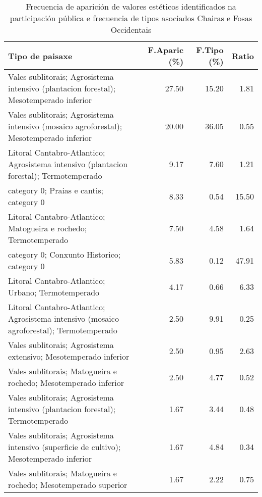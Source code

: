 \begin{table}[p]
\centering
\caption{Frecuencia de aparición de valores estéticos identificados na participación pública e frecuencia de tipos asociados Chairas e Fosas Occidentais} 
\label{vsixotest11}
\begin{tabular}{lrrr}
  \hline
Tipo de paisaxe & F.Aparic (\%) & F.Tipo (\%) & Ratio \\ 
  \hline
Vales sublitorais; Agrosistema intensivo (plantacion forestal); Mesotemperado inferior & 27.50 & 15.20 & 1.81 \\ 
  Vales sublitorais; Agrosistema intensivo (mosaico agroforestal); Mesotemperado inferior & 20.00 & 36.05 & 0.55 \\ 
  Litoral Cantabro-Atlantico; Agrosistema intensivo (plantacion forestal); Termotemperado & 9.17 & 7.60 & 1.21 \\ 
  category 0; Praias e cantis; category 0 & 8.33 & 0.54 & 15.50 \\ 
  Litoral Cantabro-Atlantico; Matogueira e rochedo; Termotemperado & 7.50 & 4.58 & 1.64 \\ 
  category 0; Conxunto Historico; category 0 & 5.83 & 0.12 & 47.91 \\ 
  Litoral Cantabro-Atlantico; Urbano; Termotemperado & 4.17 & 0.66 & 6.33 \\ 
  Litoral Cantabro-Atlantico; Agrosistema intensivo (mosaico agroforestal); Termotemperado & 2.50 & 9.91 & 0.25 \\ 
  Vales sublitorais; Agrosistema extensivo; Mesotemperado inferior & 2.50 & 0.95 & 2.63 \\ 
  Vales sublitorais; Matogueira e rochedo; Mesotemperado inferior & 2.50 & 4.77 & 0.52 \\ 
  Vales sublitorais; Agrosistema intensivo (plantacion forestal); Termotemperado & 1.67 & 3.44 & 0.48 \\ 
  Vales sublitorais; Agrosistema intensivo (superficie de cultivo); Mesotemperado inferior & 1.67 & 4.84 & 0.34 \\ 
  Vales sublitorais; Matogueira e rochedo; Mesotemperado superior & 1.67 & 2.22 & 0.75 \\ 
   \hline
\end{tabular}
\end{table}
